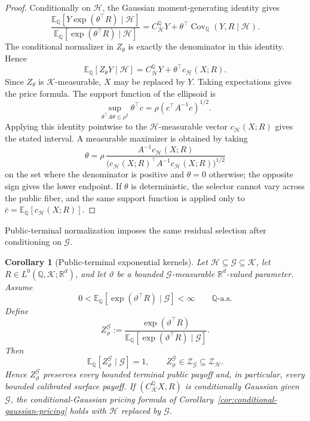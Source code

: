 \documentclass[11pt,a4paper]{amsart}
\theoremstyle{plain}
\newtheorem{corollary}[theorem]{Corollary}
\theoremstyle{definition}
\theoremstyle{remark}
\DeclareMathOperator{\Cov}{Cov}
\newcommand{\R}{\mathbb{R}}
\newcommand{\QQ}{\mathbb{Q}}
\newcommand{\EE}{\mathbb{E}}
\newcommand{\cG}{\mathcal{G}}
\newcommand{\cH}{\mathcal{H}}
\newcommand{\cK}{\mathcal{K}}
\newcommand{\cZ}{\mathcal{Z}}
\begin{document}
\begin{proof}
Conditionally on \(\cH\), the Gaussian moment-generating identity gives
\[
        \frac{\EE_\QQ[Y\exp(\theta^\top R)\mid\cH]}
        {\EE_\QQ[\exp(\theta^\top R)\mid\cH]}
        =
        C_{\cH}^{\QQ}Y+\theta^\top\Cov_\QQ(Y,R\mid\cH).
\]
The conditional normalizer in \(Z_\theta\) is exactly the denominator in this identity.  Hence
\[
        \EE_\QQ[Z_\theta Y\mid\cH]
        =
        C_{\cH}^{\QQ}Y+\theta^\top c_{\cH}(X;R).
\]
Since \(Z_\theta\) is \(\cK\)-measurable, \(X\) may be replaced by \(Y\).  Taking expectations gives
the price formula.  The support function of the ellipsoid is
\[
        \sup_{\theta^\top A\theta\le\rho^2}\theta^\top c
        =
        \rho(c^\top A^{-1}c)^{1/2}.
\]
Applying this identity pointwise to the \(\cH\)-measurable vector \(c_{\cH}(X;R)\) gives the stated
interval.  A measurable maximizer is obtained by taking
\[
        \theta
        =
        \rho\,
        \frac{A^{-1}c_{\cH}(X;R)}{\bigl(c_{\cH}(X;R)^\top A^{-1}c_{\cH}(X;R)\bigr)^{1/2}}
\]
on the set where the denominator is positive and \(\theta=0\) otherwise; the opposite sign gives
the lower endpoint.  If \(\theta\) is deterministic, the selector cannot vary across the public
fiber, and the same support function is applied only to \(\bar c=\EE_\QQ[c_{\cH}(X;R)]\).
\end{proof}

Public-terminal normalization imposes the same residual selection after conditioning on \(\cG\).

\begin{corollary}[Public-terminal exponential kernels]\label{cor:public-terminal-exponential}
Let \(\cH\subseteq\cG\subseteq\cK\), let \(R\in L^0(\QQ,\cK;\R^d)\), and let \(\vartheta\) be a
bounded \(\cG\)-measurable \(\R^d\)-valued parameter.  Assume
\[
        0<
        \EE_\QQ[\exp(\vartheta^\top R)\mid\cG]
        <
        \infty
        \qquad\QQ\text{-a.s.}
\]
Define
\[
        Z_\vartheta^{\cG}
        :=
        \frac{\exp(\vartheta^\top R)}
        {\EE_\QQ[\exp(\vartheta^\top R)\mid\cG]}.
\]
Then
\[
        \EE_\QQ[Z_\vartheta^{\cG}\mid\cG]=1,
        \qquad
        Z_\vartheta^{\cG}\in\cZ_{\cG}\subseteq\cZ_{\cH}.
\]
Hence \(Z_\vartheta^{\cG}\) preserves every bounded terminal public payoff and, in particular, every
bounded calibrated surface payoff.  If \((C_{\cK}^{\QQ}X,R)\) is conditionally Gaussian given
\(\cG\), the conditional-Gaussian pricing formula of
Corollary~\ref{cor:conditional-gaussian-pricing} holds with \(\cH\) replaced by \(\cG\).
\end{corollary}
\end{document}
